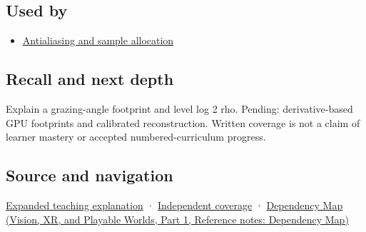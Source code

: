 \subsection{Used by}\label{appendix-b677a85ba76f-used-by}

\hypertarget{appendix-b677a85ba76f-used-by}{}

\begin{itemize}
\tightlist
\item
  \hyperref[appendix-4192b2bdd21e]{Antialiasing and sample allocation}
\end{itemize}

\subsection{Recall and next depth}\label{appendix-b677a85ba76f-recall-and-next-depth}

\hypertarget{appendix-b677a85ba76f-recall-and-next-depth}{}

Explain a grazing-angle footprint and level log 2 rho. Pending: derivative-based GPU footprints and calibrated reconstruction. Written coverage is not a claim of learner mastery or accepted numbered-curriculum progress.

\subsection{Source and navigation}\label{appendix-b677a85ba76f-source-and-navigation}

\hypertarget{appendix-b677a85ba76f-source-and-navigation}{}

\hyperref[04-visual-computing-ii-ch042-multiresolution-work-must-preserve-the-right-information]{Expanded teaching explanation} · \hyperref[appendix-fd090d982a15-xr01---independent-seeing-and-representation-source]{Independent coverage} · \href{../07-Vision-XR-and-Playable-Worlds-P01/main.pdf\#appendix-4ad47bdd269a}{Dependency Map (Vision, XR, and Playable Worlds, Part 1, Reference notes: Dependency Map)}
